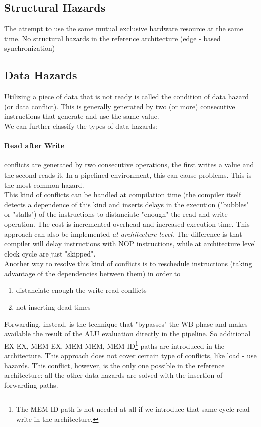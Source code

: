 \documentclass[10pt,a4paper]{article}
\begin{document}
			\subsection{Structural Hazards}
				The attempt to use the same mutual exclusive hardware resource at the same time. No structural hazards in the reference architecture (edge - based synchronization)
				
			\subsection{Data Hazards}
				Utilizing a piece of data that is not ready is called the condition of data hazard (or data conflict). This is generally generated by two (or more) consecutive instructions that generate and use the same value.\\
				We can further classify the types of data hazards:
				
				\paragraph{Read after Write} 
					conflicts are generated by two consecutive operations, the first writes a value and the second reads it. In a pipelined environment, this can cause problems. This is the most common hazard.\\
					This kind of conflicts can be handled at compilation time (the compiler itself detects a dependence of this kind and inserts delays in the execution ("bubbles" or "stalls") of the instructions to distanciate "enough" the read and write operation. The cost is incremented overhead and increased execution time. This approach can also be implemented \emph{at architecture level}. The difference is that compiler will delay instructions with NOP instructions, while at architecture level clock cycle are just "skipped".\\
					Another way to resolve this kind of conflicts is to reschedule instructions (taking advantage of the dependencies between them) in order to 
					\begin{enumerate}
						\item distanciate enough the write-read conflicts
						\item not inserting dead times
					\end{enumerate}
					Forwarding, instead, is the technique that "bypasses" the WB phase and makes available the result of the ALU evaluation directly in the pipeline. So additional EX-EX, MEM-EX, MEM-MEM, MEM-ID\footnote{The MEM-ID path is not needed at all if we introduce that same-cycle read write in the architecture.} paths are introduced in the architecture. This approach does not cover certain type of conflicts, like load - use hazards. This conflict, however, is the only one possible in the reference architecture: all the other data hazards are solved with the insertion of forwarding paths.
				
\end{document}
